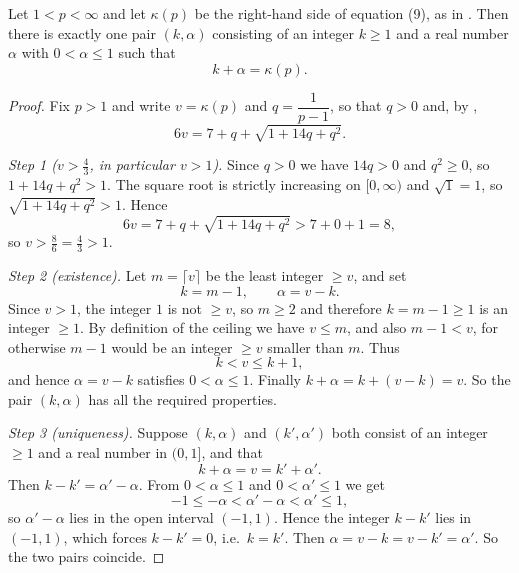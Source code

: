 \begin{lemma}
Let $1<p<\infty$ and let $\kappa(p)$ be the right-hand side of equation (9),
as in .  Then there is exactly one pair $(k,\alpha)$
consisting of an integer $k\ge1$ and a real number $\alpha$ with
$0<\alpha\le1$ such that
\[
  k+\alpha=\kappa(p).
\]
\end{lemma}
\begin{proof}
Fix $p>1$ and write $v=\kappa(p)$ and $q=\dfrac1{p-1}$, so that $q>0$ and, by
,
\[
  6v=7+q+\sqrt{1+14q+q^2}.
\]

\emph{Step 1 ($v>\tfrac43$, in particular $v>1$).}  Since $q>0$ we have
$14q>0$ and $q^2\ge0$, so $1+14q+q^2>1$.  The square root is strictly
increasing on $[0,\infty)$ and $\sqrt1=1$, so $\sqrt{1+14q+q^2}>1$.  Hence
\[
  6v=7+q+\sqrt{1+14q+q^2}>7+0+1=8 ,
\]
so $v>\tfrac86=\tfrac43>1$.

\emph{Step 2 (existence).}  Let $m=\lceil v\rceil$ be the least integer
$\ge v$, and set
\[
  k=m-1,\qquad \alpha=v-k .
\]
Since $v>1$, the integer $1$ is not $\ge v$, so $m\ge2$ and therefore
$k=m-1\ge1$ is an integer $\ge1$.  By definition of the ceiling we have
$v\le m$, and also $m-1<v$, for otherwise $m-1$ would be an integer $\ge v$
smaller than $m$.  Thus
\[
  k<v\le k+1 ,
\]
and hence $\alpha=v-k$ satisfies $0<\alpha\le1$.  Finally
$k+\alpha=k+(v-k)=v$.  So the pair $(k,\alpha)$ has all the required
properties.

\emph{Step 3 (uniqueness).}  Suppose $(k,\alpha)$ and $(k',\alpha')$ both
consist of an integer $\ge1$ and a real number in $(0,1]$, and that
\[
  k+\alpha=v=k'+\alpha' .
\]
Then $k-k'=\alpha'-\alpha$.  From $0<\alpha\le1$ and $0<\alpha'\le1$ we get
\[
  -1\le-\alpha<\alpha'-\alpha<\alpha'\le1,
\]
so $\alpha'-\alpha$ lies in the open interval $(-1,1)$.  Hence the integer
$k-k'$ lies in $(-1,1)$, which forces $k-k'=0$, i.e.\ $k=k'$.  Then
$\alpha=v-k=v-k'=\alpha'$.  So the two pairs coincide.
\end{proof}
